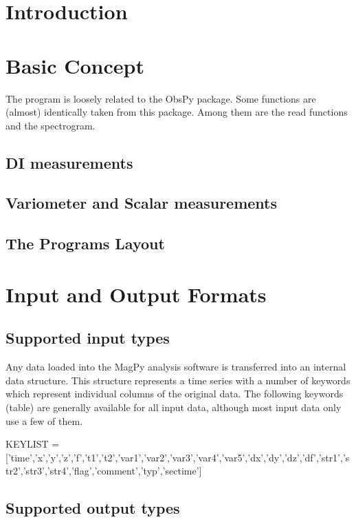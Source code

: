 \section{Introduction}


\section{Basic Concept}

The program is loosely related to the ObsPy package. Some functions are (almost) identically taken from this package. Among them are the read functions and the spectrogram.

\subsection{DI measurements}

\subsection{Variometer and Scalar measurements}

\subsection{The Programs Layout}


\section{Input and Output Formats}

\subsection{Supported input types}

Any data loaded into the MagPy analysis software is transferred into an internal data structure. This structure represents a time series with a number of keywords which represent individual columns of the original data. The following keywords (table) are generally available for all input data, although most input data only use a few of them.

KEYLIST = ['time','x','y','z','f','t1','t2','var1','var2','var3','var4','var5','dx','dy','dz','df','str1','str2','str3','str4','flag','comment','typ','sectime']


\subsection{Supported output types}

